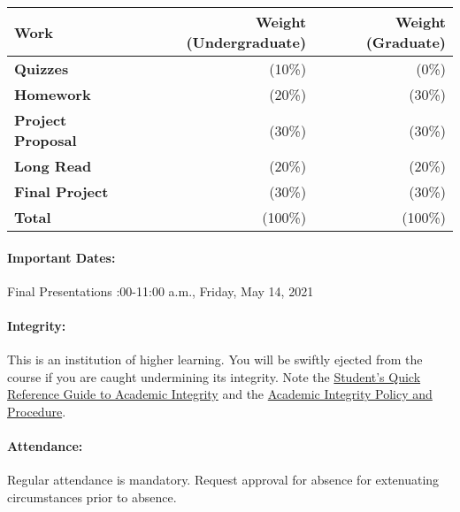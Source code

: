 \documentclass[11pt, a4paper]{article}
\begin{document}
\begin{table}[h]
\begin{tabularx}{\textwidth}{Xrr}
        \textbf{Work} & \textbf{Weight (Undergraduate)} & \textbf{Weight (Graduate)} \\
\hline
\textbf{Quizzes}           & (10\%)   & (0\%)\\
\textbf{Homework}          & (20\%)   & (30\%)\\
\textbf{Project Proposal}  & (30\%)   & (30\%)\\
\textbf{Long Read}         & (20\%)   & (20\%)\\
\textbf{Final Project}     & (30\%)   & (30\%)\\
\hline
\textbf{Total}             & (100\%) & (100\%)\\
\end{tabularx}
\end{table}

\paragraph{Important Dates:}
\begin{center} \begin{minipage}{3.8in}
\begin{flushleft}
Final Presentations       :00-11:00 a.m., Friday, May 14, 2021\\
\end{flushleft}
\end{minipage}
\end{center}

\paragraph{Integrity:} This is an institution of higher learning. You will 
        be swiftly ejected from the course if you are caught undermining its 
                integrity. Note the 
                \href{http://www.provost.illinois.edu/academicintegrity/students.html}{Student's 
                Quick Reference Guide to Academic Integrity} and the 
                \href{http://studentcode.illinois.edu/article1_part4_1-401.html}{Academic 
                Integrity Policy and Procedure}.
\paragraph{Attendance:} Regular attendance is mandatory. Request approval
        for absence for extenuating circumstances prior to absence.
\end{document}
